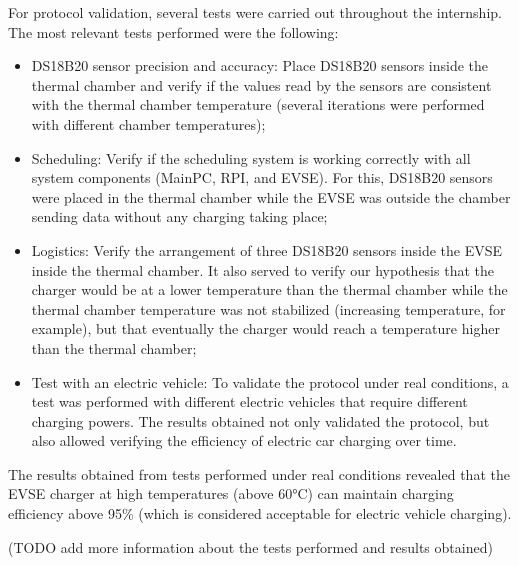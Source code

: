 For protocol validation, several tests were carried out throughout the internship. The most relevant tests performed were the following:
\begin{itemize}
    \item DS18B20 sensor precision and accuracy: Place DS18B20 sensors inside the thermal chamber and verify if the values read by the sensors are consistent with the thermal chamber temperature (several iterations were performed with different chamber temperatures);
    \item Scheduling: Verify if the scheduling system is working correctly with all system components (MainPC, RPI, and EVSE). For this, DS18B20 sensors were placed in the thermal chamber while the EVSE was outside the chamber sending data without any charging taking place;
    \item Logistics: Verify the arrangement of three DS18B20 sensors inside the EVSE inside the thermal chamber. It also served to verify our hypothesis that the charger would be at a lower temperature than the thermal chamber while the thermal chamber temperature was not stabilized (increasing temperature, for example), but that eventually the charger would reach a temperature higher than the thermal chamber;
    \item Test with an electric vehicle: To validate the protocol under real conditions, a test was performed with different electric vehicles that require different charging powers. The results obtained not only validated the protocol, but also allowed verifying the efficiency of electric car charging over time.
\end{itemize}

The results obtained from tests performed under real conditions revealed that the EVSE charger at high temperatures (above 60°C) can maintain charging efficiency above 95\% (which is considered acceptable for electric vehicle charging).

(TODO add more information about the tests performed and results obtained)